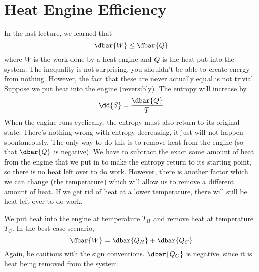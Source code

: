 \documentclass[a4paper,twoside,master.tex]{subfiles}
\begin{document}

\section{Heat Engine Efficiency}
\label{sec:heat_engine_efficiency}

In the last lecture, we learned that
\begin{equation}
    \dbar{W} \leq \dbar{Q} 
\end{equation}
where $ W $ is the work done by a heat engine and $ Q $ is the heat put into the system. The inequality is not surprising, you shouldn't be able to create energy from nothing. However, the fact that these are never actually equal is not trivial. Suppose we put heat into the engine (reversibly). The entropy will increase by
\begin{equation}
    \dd{S} = \frac{\dbar{Q}}{T}
\end{equation}
When the engine runs cyclically, the entropy must also return to its original state. There's nothing wrong with entropy decreasing, it just will not happen spontaneously. The only way to do this is to remove heat from the engine (so that $ \dbar{Q} $ is negative). We have to subtract the exact same amount of heat from the engine that we put in to make the entropy return to its starting point, so there is no heat left over to do work. However, there is another factor which we can change (the temperature) which will allow us to remove a different amount of heat. If we get rid of heat at a lower temperature, there will still be heat left over to do work.

We put heat into the engine at temperature $ T_H $ and remove heat at temperature $ T_C $. In the best case scenario,
\begin{equation}
    \dbar{W} = \dbar{Q_H} + \dbar{Q_C}
\end{equation}
Again, be cautious with the sign conventions. $ \dbar{Q_C} $ is negative, since it is heat being removed from the system.
\end{document}
